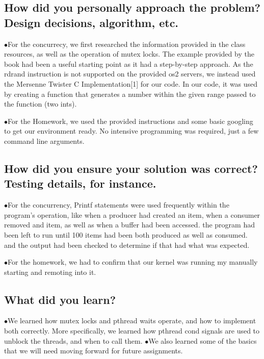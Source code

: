 \documentclass[letterpaper,10pt,fleqn,draftclsnofoot,onecolumn]{IEEEtran}
\begin{document}
	\subsection{How did you personally approach the problem? Design decisions, algorithm, etc.}
	$\bullet$For the concurrecy, we first researched the information provided in the class resources, as well as the operation of mutex locks. The example provided by the book had been a useful starting point as it had a step-by-step approach. As the rdrand instruction is not supported on the provided os2 servers, we instead used the Mersenne Twister C Implementation[1] for our code. In our code, it was used by creating a function that generates a number within the given range passed to the function (two ints).
	
	$\bullet$For the Homework, we used the provided instructions and some basic googling to get our environment ready. No intensive programming was required, just a few command line arguments.
	
	
	\subsection{How did you ensure your solution was correct? Testing details, for instance.}
	$\bullet$For the concurrency, Printf statements were used frequently within the program's operation, like when a producer had created an item, when a consumer removed and item, as well as when a buffer had been accessed. the program had been left to run until 100 items had been both produced as well as consumed. and the output had been checked to determine if that had what was expected.
	
	$\bullet$For the homework, we had to confirm that our kernel was running my manually starting and remoting into it.
	
	\subsection{What did you learn?}
	$\bullet$We learned how mutex locks and pthread waits operate, and how to implement both correctly. More specifically, we learned how pthread cond signals are used to unblock the threads, and when to call them. 
	$\bullet$We also learned some of the basics that we will need moving forward for future assignments.
	 
\end{document}
